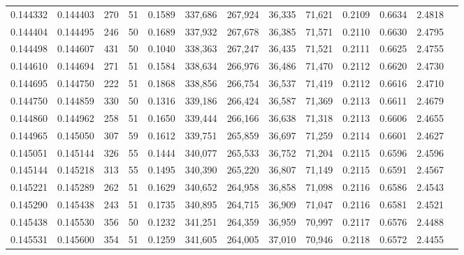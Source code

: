 \begin{tabular}{rrrrrrrrrrrrr}
0.144332 & 0.144403 &   270 &  51 &                                     0.1589 & 337,686 & 267,924 &  36,335 &  71,621 & 0.2109 & 0.6634 & 2.4818 \\
0.144404 & 0.144495 &   246 &  50 &                                     0.1689 & 337,932 & 267,678 &  36,385 &  71,571 & 0.2110 & 0.6630 & 2.4795 \\
0.144498 & 0.144607 &   431 &  50 &                                     0.1040 & 338,363 & 267,247 &  36,435 &  71,521 & 0.2111 & 0.6625 & 2.4755 \\
0.144610 & 0.144694 &   271 &  51 &                                     0.1584 & 338,634 & 266,976 &  36,486 &  71,470 & 0.2112 & 0.6620 & 2.4730 \\
0.144695 & 0.144750 &   222 &  51 &                                     0.1868 & 338,856 & 266,754 &  36,537 &  71,419 & 0.2112 & 0.6616 & 2.4710 \\
0.144750 & 0.144859 &   330 &  50 &                                     0.1316 & 339,186 & 266,424 &  36,587 &  71,369 & 0.2113 & 0.6611 & 2.4679 \\
0.144860 & 0.144962 &   258 &  51 &                                     0.1650 & 339,444 & 266,166 &  36,638 &  71,318 & 0.2113 & 0.6606 & 2.4655 \\
0.144965 & 0.145050 &   307 &  59 &                                     0.1612 & 339,751 & 265,859 &  36,697 &  71,259 & 0.2114 & 0.6601 & 2.4627 \\
0.145051 & 0.145144 &   326 &  55 &                                     0.1444 & 340,077 & 265,533 &  36,752 &  71,204 & 0.2115 & 0.6596 & 2.4596 \\
0.145144 & 0.145218 &   313 &  55 &                                     0.1495 & 340,390 & 265,220 &  36,807 &  71,149 & 0.2115 & 0.6591 & 2.4567 \\
0.145221 & 0.145289 &   262 &  51 &                                     0.1629 & 340,652 & 264,958 &  36,858 &  71,098 & 0.2116 & 0.6586 & 2.4543 \\
0.145290 & 0.145438 &   243 &  51 &                                     0.1735 & 340,895 & 264,715 &  36,909 &  71,047 & 0.2116 & 0.6581 & 2.4521 \\
0.145438 & 0.145530 &   356 &  50 &                                     0.1232 & 341,251 & 264,359 &  36,959 &  70,997 & 0.2117 & 0.6576 & 2.4488 \\
0.145531 & 0.145600 &   354 &  51 &                                     0.1259 & 341,605 & 264,005 &  37,010 &  70,946 & 0.2118 & 0.6572 & 2.4455 \\

\end{tabular}
